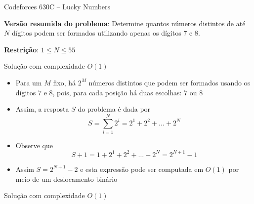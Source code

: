 \begin{frame}[fragile]{Codeforces 630C -- Lucky Numbers}

    \textbf{Versão resumida do problema}: Determine quantos números distintos de até $N$ dígitos
        podem ser formados utilizando apenas os dígitos 7 e 8.

    \vspace{0.1in}
    \textbf{Restrição}: $1\leq N\leq 55$

\end{frame}

\begin{frame}[fragile]{Solução com complexidade $O(1)$}

    \begin{itemize}
        \item Para um $M$ fixo, há $2^M$ números distintos que podem ser formados usando
            os dígitos 7 e 8, pois, para cada posição há duas escolhas: 7 ou 8

        \item Assim, a resposta $S$ do problema é dada por
        $$
            S = \sum_{i = 1}^N 2^i = 2^1 + 2^2 + \ldots + 2^N
        $$

        \item Observe que
        $$
            S + 1 = 1 + 2^1 + 2^2 + \ldots + 2^N = 2^{N + 1} - 1
        $$

        \item Assim $S = 2^{N + 1} - 2$ e esta expressão pode ser computada em $O(1)$ por meio
            de um deslocamento binário
    \end{itemize}

\end{frame}

\begin{frame}[fragile]{Solução com complexidade $O(1)$}
\end{frame}
